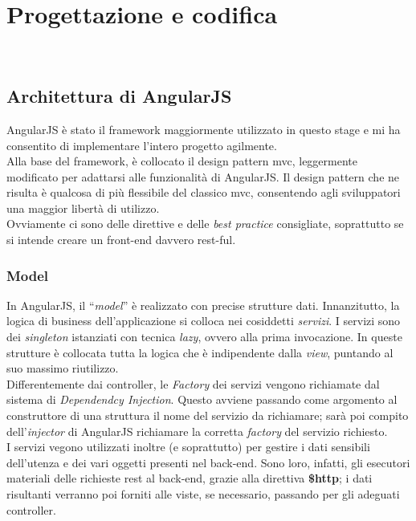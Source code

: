 
\chapter{Progettazione e codifica}
\label{cap:progettazione-codifica}

\\


\section{Architettura di AngularJS}
AngularJS è stato il framework maggiormente utilizzato in questo stage e mi ha consentito di implementare l'intero progetto agilmente.\\
Alla base del framework, è collocato il design pattern \gls{mvc}, leggermente modificato per adattarsi alle funzionalità di AngularJS. Il design pattern che ne risulta è qualcosa di più flessibile del classico \gls{mvc}, consentendo agli sviluppatori una maggior libertà di utilizzo.\\
Ovviamente ci sono delle direttive e delle \emph{best practice} consigliate, soprattutto se si intende creare un \gls{front-end} davvero \gls{rest}-ful.

\subsection{Model}
In AngularJS, il "`\emph{model}"' è realizzato con precise strutture dati. Innanzitutto, la logica di business dell'applicazione si colloca nei cosiddetti \emph{servizi}. I servizi sono dei \emph{singleton} istanziati con tecnica \emph{lazy}, ovvero alla prima invocazione. In queste strutture è collocata tutta la logica che è indipendente dalla \emph{view}, puntando al suo massimo riutilizzo.\\
Differentemente dai controller, le \emph{Factory} dei servizi vengono richiamate dal sistema di \emph{Dependendcy Injection}. Questo avviene passando come argomento al construttore di una struttura il nome del servizio da richiamare; sarà poi compito dell'\emph{injector} di AngularJS richiamare la corretta \emph{factory} del servizio richiesto.\\
I servizi vegono utilizzati inoltre (e soprattutto) per gestire i dati sensibili dell'utenza e dei vari oggetti presenti nel \gls{back-end}. Sono loro, infatti, gli esecutori materiali delle richieste \gls{rest} al \gls{back-end}, grazie alla direttiva \textbf{\$http}; i dati risultanti verranno poi forniti alle viste, se necessario, passando per gli adeguati controller.

